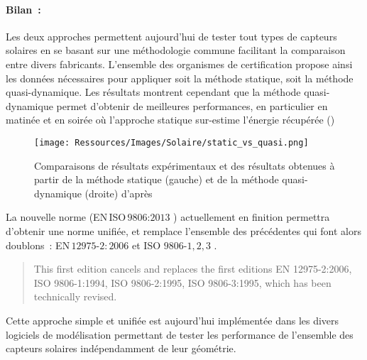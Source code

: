 \paragraph{Bilan~:} %
\label{par:bilan}
Les deux approches permettent aujourd’hui de tester tout types de capteurs solaires
en se basant sur une méthodologie commune facilitant la comparaison entre divers
fabricants. L’ensemble des organismes de certification propose ainsi les données nécessaires
pour appliquer soit la méthode statique, soit la méthode quasi-dynamique.
Les résultats montrent cependant que la méthode quasi-dynamique permet d’obtenir de
meilleures performances, en particulier en matinée et en soirée
où l’approche statique sur-estime l’énergie récupérée ()

\begin{figure}
    \centering
    \texttt{[image: Ressources/Images/Solaire/static\_vs\_quasi.png]}
    \caption{Comparaisons de résultats expérimentaux et des résultats obtenues
             à partir de la méthode statique (gauche) et de la méthode quasi-dynamique (droite)
             d’après \textcite{Zambolin20101382}}
    \label{fig:compare_static_quasi_dyn}
\end{figure}

La nouvelle norme (EN\,ISO\,$9806$:$2013$ ) actuellement en finition permettra d’obtenir
une norme unifiée, et remplace l’ensemble des précédentes qui font alors doublons~:
EN\,$12975$-$2:2006$ et ISO $9806$-$1,2,3$ \parencite{ISO98062013}.
\blockquote{This first edition cancels and replaces the first editions EN 12975-2:2006,
ISO 9806-1:1994, ISO 9806-2:1995, ISO 9806-3:1995, which has been technically revised.}
Cette approche simple et unifiée est aujourd’hui implémentée dans les divers logiciels
de modélisation permettant de tester les performance de l’ensemble des capteurs solaires
indépendamment de leur géométrie.



